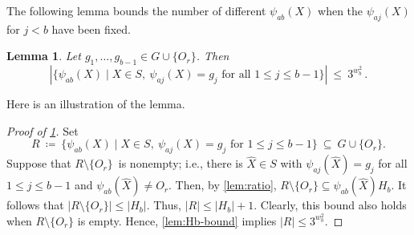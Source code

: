 \documentclass{lmcs}
\newtheorem{lemma}[thm]{Lemma}
\theoremstyle{definition}
\begin{document}
The following lemma bounds the number of different $\psi_{a b}(X)$ when the $\psi_{a j}(X)$ for $j < b$ have been fixed.
\begin{lemma}\label{lem:row-step}
Let $g_1, \ldots, g_{b-1} \in G \cup \{O_r\}$.
Then
\[
 |\{\psi_{a b}(X) \mid X \in S, \ \psi_{a j}(X) = g_j \text{ for all } 1 \le j \le b-1\}| \ \le \ 3^{w_b^2}\,.
\]
\end{lemma}
Here is an illustration of the lemma.
\begin{center}
\end{center}
\begin{proof}[Proof of \cref{lem:row-step}]
Set
\[
R \ \coloneqq \ \{\psi_{a b}(X) \mid X \in S,\ \psi_{a j}(X)=g_j \text{ for } 1\le j\le b-1\} \ \subseteq \ G\cup\{O_r\}.
\]
Suppose that $R \setminus \{O_r\}$~is nonempty; i.e., there is $\widehat{X} \in S$ with $\psi_{a j}(\widehat{X}) = g_j$ for all $1 \le j \le b-1$ and $\psi_{a b}(\widehat{X}) \ne O_r$.
Then, by \cref{lem:ratio}, $R \setminus \{O_r\} \subseteq \psi_{a b}(\widehat{X}) H_b$.
It follows that $|R \setminus \{O_r\}| \le |H_b|$.
Thus, $|R| \le |H_b| + 1$.
Clearly, this bound also holds when $R \setminus \{O_r\}$ is empty.
Hence, \cref{lem:Hb-bound} implies $|R| \le 3^{w_b^2}$.
\end{proof}
\end{document}
